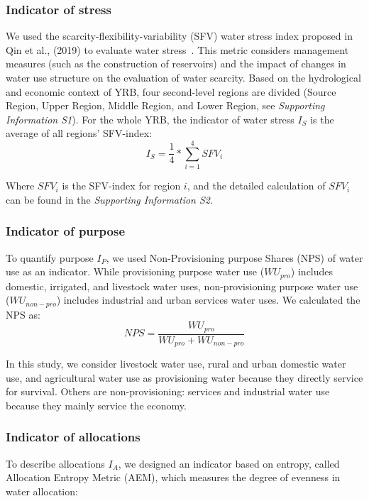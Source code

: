 \documentclass[draft]{../agujournal2019}
\begin{document}
	\subsubsection*{Indicator of stress}
	We used the scarcity-flexibility-variability (SFV) water stress index proposed in Qin et al., (2019) to evaluate water stress~\cite{qin2019}. This metric considers management measures (such as the construction of reservoirs) and the impact of changes in water use structure on the evaluation of water scarcity. Based on the hydrological and economic context of YRB, four second-level regions are divided (Source Region, Upper Region, Middle Region, and Lower Region, see \textit{Supporting Information S1}). For the whole YRB, the indicator of water stress $I_S$ is the average of all regions' SFV-index:
	\begin{equation}
		I_S = \frac{1}{4} * \sum_{i=1}^4 SFV_{i}
	\end{equation}

	Where $SFV_i$ is the SFV-index for region $i$, and the detailed calculation of $SFV_i$ can be found in the \textit{Supporting Information S2}.

	\subsubsection*{Indicator of purpose}
	To quantify purpose $I_P$, we used Non-Provisioning purpose Shares (NPS) of water use as an indicator. While provisioning purpose water use ($WU_{pro}$) includes domestic, irrigated, and livestock water uses, non-provisioning purpose water use ($WU_{non-pro}$) includes industrial and urban services water uses. We calculated the NPS as:
	\begin{equation}
		NPS = \frac{WU_{pro}}{WU_{pro} + WU_{non-pro}}
	\end{equation}

	In this study, we consider livestock water use, rural and urban domestic water use, and agricultural water use as provisioning water because they directly service for survival. Others are non-provisioning: services and industrial water use because they mainly service the economy.

	\subsubsection*{Indicator of allocations}
	To describe allocations $I_A$, we designed an indicator based on entropy, called Allocation Entropy Metric (AEM), which measures the degree of evenness in water allocation:
\end{document}
